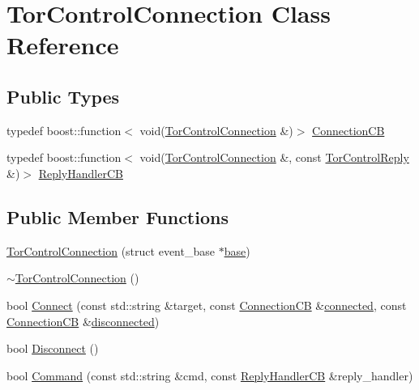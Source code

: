 \hypertarget{class_tor_control_connection}{}\section{Tor\+Control\+Connection Class Reference}
\label{class_tor_control_connection}
\subsection*{Public Types}
\begin{DoxyCompactItemize}
\item 
typedef boost\+::function$<$ void(\mbox{\hyperlink{class_tor_control_connection}{Tor\+Control\+Connection}} \&)$>$ \mbox{\hyperlink{class_tor_control_connection_a30ec1d9f7e35720dc435e555e212ad73}{Connection\+CB}}
\item 
typedef boost\+::function$<$ void(\mbox{\hyperlink{class_tor_control_connection}{Tor\+Control\+Connection}} \&, const \mbox{\hyperlink{class_tor_control_reply}{Tor\+Control\+Reply}} \&)$>$ \mbox{\hyperlink{class_tor_control_connection_a67d9147b8c27456cc7fe15e4d6d8e844}{Reply\+Handler\+CB}}
\end{DoxyCompactItemize}
\subsection*{Public Member Functions}
\begin{DoxyCompactItemize}
\item 
\mbox{\hyperlink{class_tor_control_connection_a5850ebb205bddf1fbc97271fae8eaf78}{Tor\+Control\+Connection}} (struct event\+\_\+base $\ast$\mbox{\hyperlink{class_tor_control_connection_af68563075f85652d32cc0b6d8417699c}{base}})
\item 
\mbox{\hyperlink{class_tor_control_connection_a323e3a8e9649a74fbf11456fe3e160d3}{$\sim$\+Tor\+Control\+Connection}} ()
\item 
bool \mbox{\hyperlink{class_tor_control_connection_a36b6359caf9a304efe310b9b7141a939}{Connect}} (const std\+::string \&target, const \mbox{\hyperlink{class_tor_control_connection_a30ec1d9f7e35720dc435e555e212ad73}{Connection\+CB}} \&\mbox{\hyperlink{class_tor_control_connection_ad8b8800db771cb4ca39efb078509bef4}{connected}}, const \mbox{\hyperlink{class_tor_control_connection_a30ec1d9f7e35720dc435e555e212ad73}{Connection\+CB}} \&\mbox{\hyperlink{class_tor_control_connection_afa5564a2d7f80d436b92bf6eb4b38192}{disconnected}})
\item 
bool \mbox{\hyperlink{class_tor_control_connection_addb42114063641eab12be2fc39b859d5}{Disconnect}} ()
\item 
bool \mbox{\hyperlink{class_tor_control_connection_a5d0292a1389bb0f78d15fe6c06a2baeb}{Command}} (const std\+::string \&cmd, const \mbox{\hyperlink{class_tor_control_connection_a67d9147b8c27456cc7fe15e4d6d8e844}{Reply\+Handler\+CB}} \&reply\+\_\+handler)
\end{DoxyCompactItemize}
